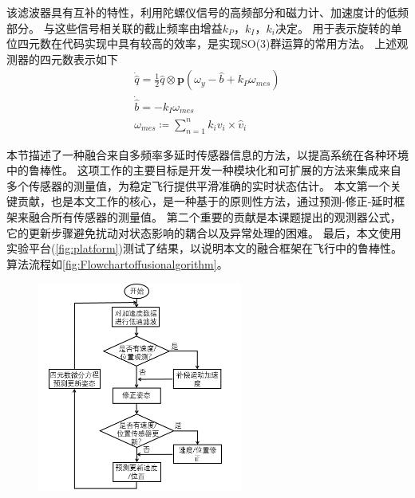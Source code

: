 \documentclass[
  type=master
]{gdutthesis}
\begin{document}
该滤波器具有互补的特性，利用陀螺仪信号的高频部分和磁力计、加速度计的低频部分\cite{mahony2008nonlinear}。
与这些信号相关联的截止频率由增益$k_P$，$k_I$，$k_i$决定。
用于表示旋转的单位四元数在代码实现中具有较高的效率，是实现SO(3)\vspace{1ex}群运算的常用方法。
上述观测器的四元数表示如下
\begin{gather}\label{eq:quatfilter}
		\dot{\hat{q}}=\frac{1}{2} \hat{q} \otimes \mathbf{p}(\omega_y - \hat{b} + k_P \omega_{mes})\\
		\dot{\hat{b}}=-k_I \omega_{mes}\\
		\omega_{mes} \coloneqq \sum_{n=1}^{n} k_i v_i \times \hat{v}_i	
\end{gather}

本节描述了一种融合来自多频率多延时传感器信息的方法，以提高系统在各种环境中的鲁棒性。
这项工作的主要目标是开发一种模块化和可扩展的方法来集成来自多个传感器的测量值，为稳定飞行提供平滑准确的实时状态估计。
本文第一个关键贡献，也是本文工作的核心，是一种基于\parencite{mahony2008nonlinear}的原则性方法，通过预测-修正-延时框架来融合所有传感器的测量值。
第二个重要的贡献是本课题提出的观测器公式，它的更新步骤避免扰动对状态影响的耦合以及异常处理的困难。
最后，本文使用实验平台(\autoref{fig:platform})测试了结果，以说明本文的融合框架在飞行中的鲁棒性。
算法流程如\autoref{fig:Flowchartoffusionalgorithm}。
\begin{figure}[H]
	\centering
	\includegraphics[width=0.6\textwidth]{屏幕截图 2022-03-06 210135.png}
	\label{fig:Flowchartoffusionalgorithm}
\end{figure}
\end{document}
